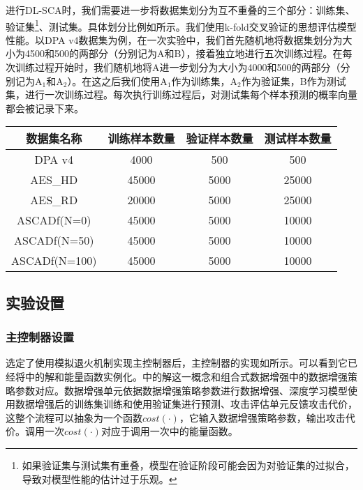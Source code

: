 {	进行DL-SCA时，我们需要进一步将数据集划分为互不重叠的三个部分：训练集、验证集\footnote{如果验证集与测试集有重叠，模型在验证阶段可能会因为对验证集的过拟合，导致对模型性能的估计过于乐观。}、测试集。具体划分比例如所示。我们使用k-fold交叉验证的思想评估模型性能。以DPA v4数据集为例，在一次实验中，我们首先随机地将数据集划分为大小为4500和500的两部分（分别记为A和B），接着独立地进行五次训练过程。在每次训练过程开始时，我们随机地将A进一步划分为大小为4000和500的两部分（分别记为A$_1$和A$_2$）。在这之后我们使用A$_1$作为训练集，A$_2$作为验证集，B作为测试集，进行一次训练过程。每次执行训练过程后，对测试集每个样本预测的概率向量都会被记录下来。%
	\begin{table}[!h]
		\label{tab:partition}
		\centering
		\small
		\begin{tabular}{cccc}
			\hline
			数据集名称&训练样本数量&验证样本数量&测试样本数量\\
			\hline
			DPA v4    &4000 &500 &500\\
			AES\_HD   &45000&5000&25000\\
			AES\_RD   &20000&5000&25000\\
			ASCADf(N=0)&45000&5000&10000\\
			ASCADf(N=50)&45000&5000&10000\\
			ASCADf(N=100)&45000&5000&10000\\
			\hline
		\end{tabular}
	\end{table}
	\subsection{实验设置}
	\subsubsection{主控制器设置}\label{subss:controllersettings}
	选定了使用模拟退火机制实现主控制器后，主控制器的实现如所示。可以看到它已经将中的解和能量函数实例化。中的解这一概念和组合式数据增强中的数据增强策略参数对应。数据增强单元依据数据增强策略参数进行数据增强、深度学习模型使用数据增强后的训练集训练和使用验证集进行预测、攻击评估单元反馈攻击代价，这整个流程可以抽象为一个函数$cost(\cdot)$，它输入数据增强策略参数，输出攻击代价。调用一次$cost(\cdot)$对应于调用一次中的能量函数。
	
}
